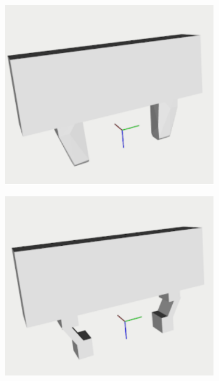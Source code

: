 \begin{figure}[t]
\centering
\hfill
\begin{subfigure}{0.3\columnwidth}
    \includegraphics[width=\linewidth]{figures/mesh_cropped.pdf}
    \caption{}
\end{subfigure}%
\hfill
\begin{subfigure}{0.3\columnwidth}
    \includegraphics[width=\linewidth]{figures/doulbe_simple_cropped.pdf}
    \caption{}
\end{subfigure}%

\end{figure}
